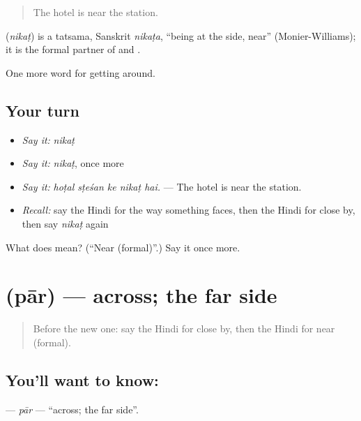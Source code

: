 \begin{quote}
The hotel is near the station.
\end{quote}

\begin{cousinweb}
\textbf{} (\emph{nikaṭ}) is a tatsama, Sanskrit \emph{nikaṭa}, \textquotedblleft{}being at the side, near\textquotedblright{} (Monier-Williams); it is the formal partner of  and .
\end{cousinweb}

\begin{grammarlens}[title={What you've built}]
One more word for getting around.
\end{grammarlens}

\subsection*{Your turn}
\begin{itemize}
\raggedright
  \item \emph{Say it:} \emph{nikaṭ}
  \item \emph{Say it:} \emph{nikaṭ}, once more
  \item \emph{Say it:} \emph{hoṭal sṭeśan ke nikaṭ hai.} — The hotel is near the station.
  \item \emph{Recall:} say the Hindi for the way something faces, then the Hindi for close by, then say \emph{nikaṭ} again
\end{itemize}

\begin{tcolorbox}[breakable,colback=teal!4,colframe=teal!35!black,title={Before you move on}]
What does  mean? (\textquotedblleft{}Near (formal)\textquotedblright{}.) Say it once more.
\end{tcolorbox}
\section[\texorpdfstring{\hi{पार} (pār)}{पार (pār)}]{ (pār) — across; the far side}

\label{lesson:HI-C418-par}



\begin{quote}
Before the new one: say the Hindi for close by, then the Hindi for near (formal).
\end{quote}

\subsection*{You'll want to know: }
\textbf{} — \emph{pār} — \textquotedblleft{}across; the far side\textquotedblright{}.

